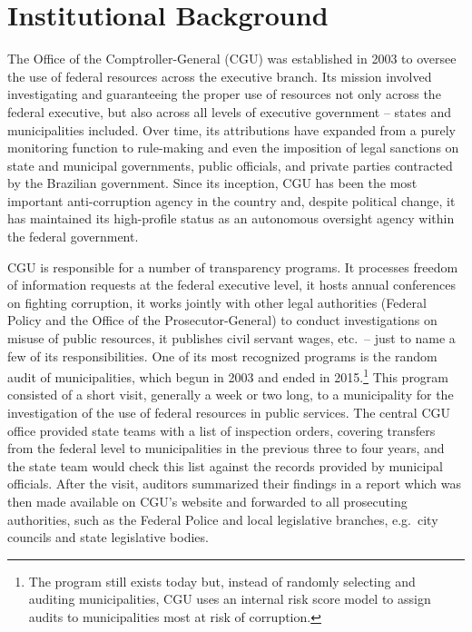\documentclass[11pt]{article}
\begin{document}
\section{Institutional Background} \label{sec:background_paper3}

The Office of the Comptroller-General (CGU) was established in 2003 to oversee the use of federal resources across the executive branch. Its mission involved investigating and guaranteeing the proper use of resources not only across the federal executive, but also across all levels of executive government -- states and municipalities included. Over time, its attributions have expanded from a purely monitoring function to rule-making and even the imposition of legal sanctions on state and municipal governments, public officials, and private parties contracted by the Brazilian government. Since its inception, CGU has been the most important anti-corruption agency in the country and, despite political change, it has maintained its high-profile status as an autonomous oversight agency within the federal government.

CGU is responsible for a number of transparency programs. It processes freedom of information requests at the federal executive level, it hosts annual conferences on fighting corruption, it works jointly with other legal authorities (Federal Policy and the Office of the Prosecutor-General) to conduct investigations on misuse of public resources, it publishes civil servant wages, etc.~-- just to name a few of its responsibilities. One of its most recognized programs is the random audit of municipalities, which begun in 2003 and ended in 2015.\footnote{The program still exists today but, instead of randomly selecting and auditing municipalities, CGU uses an internal risk score model to assign audits to municipalities most at risk of corruption.} This program consisted of a short visit, generally a week or two long, to a municipality for the investigation of the use of federal resources in public services. The central CGU office provided state teams with a list of inspection orders, covering transfers from the federal level to municipalities in the previous three to four years, and the state team would check this list against the records provided by municipal officials. After the visit, auditors summarized their findings in a report which was then made available on CGU's website and forwarded to all prosecuting authorities, such as the Federal Police and local legislative branches, e.g.~city councils and state legislative bodies.
\end{document}
